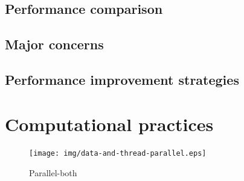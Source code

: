 \documentclass{article}
\begin{document}
    \subsection{Performance comparison}

    \subsection{Major concerns}

    \subsection{Performance improvement strategies}

\section{Computational practices}




\begin{figure}[h]
\begin{center}
\texttt{[image: img/data-and-thread-parallel.eps]}
\end{center}
\caption{Parallel-both}
\label{fig:parallel-both}
\end{figure}
\end{document}
